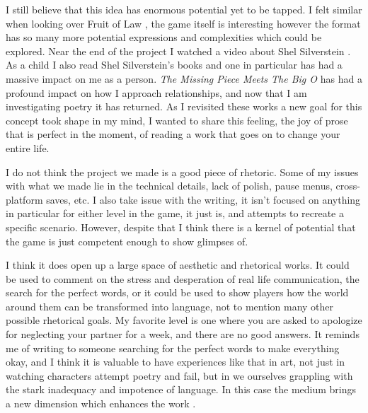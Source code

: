 \documentclass[12pt]{report}
\begin{document}
\begin{description}
    I still believe that this idea has enormous potential yet to be tapped. I felt similar when looking over Fruit 
    of Law \parencite{fruitlaw}, the game itself is interesting however the format has so many more potential 
    expressions and complexities which could be explored. Near the end of the project I watched a video about Shel 
    Silverstein \parencite{attic}. As a child I also read Shel Silverstein’s books and one in particular has had
    a massive impact on me as a person. \textit{The Missing Piece Meets The Big O} \parencite{bigO} has had a profound
    impact on how I approach relationships, and now that I am investigating poetry it has returned. As I revisited
    these works a new goal for this concept took shape in my mind, I wanted to share this feeling, the joy of prose
    that is perfect in the moment, of reading a work that goes on to change your entire life.

    I do not think the project we made is a good piece of rhetoric. Some of my issues with what we made lie in
    the technical details, lack of polish, pause menus, cross-platform saves, etc. I also take issue with
    the writing, it isn't focused on anything in particular for either level in the game, it just is, and attempts
    to recreate a specific scenario. However, despite that I think there is a kernel of potential that the game
    is just competent enough to show glimpses of.

    I think it does open up a large space of aesthetic and rhetorical works. It could be used to comment on the 
    stress and desperation of real life communication, the search for the perfect words, or it could be used to
    show players how the world around them can be transformed into language, not to mention many other possible 
    rhetorical goals. My favorite level is one where you are asked to apologize for neglecting your partner
    for a week, and there are no good answers. It reminds me of writing to someone searching for the perfect
    words to make everything okay, and I think it is valuable to have experiences like that in art, not just
    in watching characters attempt poetry and fail, but in we ourselves grappling with the stark inadequacy and
    impotence of language. In this case the medium brings a new dimension which enhances the work \parencite{medium}.
    
\end{description}


\printbibliography
\end{document}
